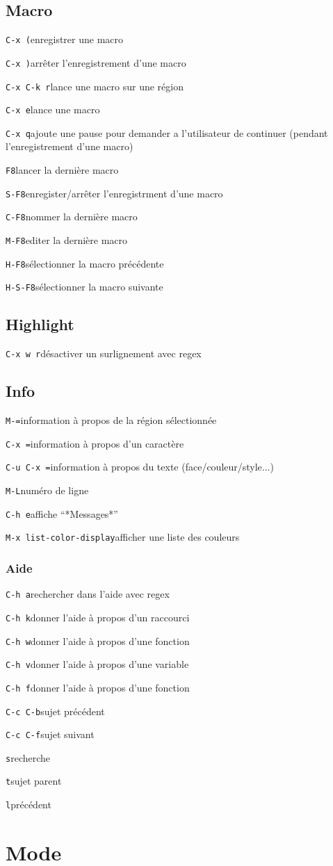 \documentclass[10pt,landscape]{article}
\def\cm#1#2{{\tt#1}\dotfill#2\par}
\begin{document}
\begin{multicols}{3}
\subsection{Macro}
\cm{C-x (}{enregistrer une macro}
\cm{C-x )}{arrêter l'enregistrement d'une macro}
\cm{C-x C-k r}{lance une macro sur une région}
\cm{C-x e}{lance une macro}
\cm{C-x q}{ajoute une pause pour demander a l'utilisateur de continuer (pendant l'enregistrement d'une macro)}
\cm{F8}{lancer la dernière macro}
\cm{S-F8}{enregister/arrêter l'enregistrment d'une macro}
\cm{C-F8}{nommer la dernière macro}
\cm{M-F8}{editer la dernière macro}
\cm{H-F8}{sélectionner la macro précédente}
\cm{H-S-F8}{sélectionner la macro suivante}





\subsection{Highlight}
\cm{C-x w r}{désactiver un surlignement avec regex}





\subsection{Info}
\cm{M-=}{information à propos de la région sélectionnée}
\cm{C-x =}{information à propos d'un caractère}
\cm{C-u C-x =}{information à propos du texte (face/couleur/style...)}
\cm{M-L}{numéro de ligne}
\cm{C-h e}{affiche ``*Messages*''}
\cm{M-x list-color-display}{afficher une liste des couleurs}

\subsubsection{Aide}
\cm{C-h a}{rechercher dans l'aide avec regex}
\cm{C-h k}{donner l'aide à propos d'un raccourci}
\cm{C-h w}{donner l'aide à propos d'une fonction}
\cm{C-h v}{donner l'aide à propos d'une variable}
\cm{C-h f}{donner l'aide à propos d'une fonction}
\cm{C-c C-b}{sujet précédent}
\cm{C-c C-f}{sujet suivant}
\cm{s}{recherche}
\cm{t}{sujet parent}
\cm{l}{précédent}






\section{Mode}


\end{multicols}
\end{document}
